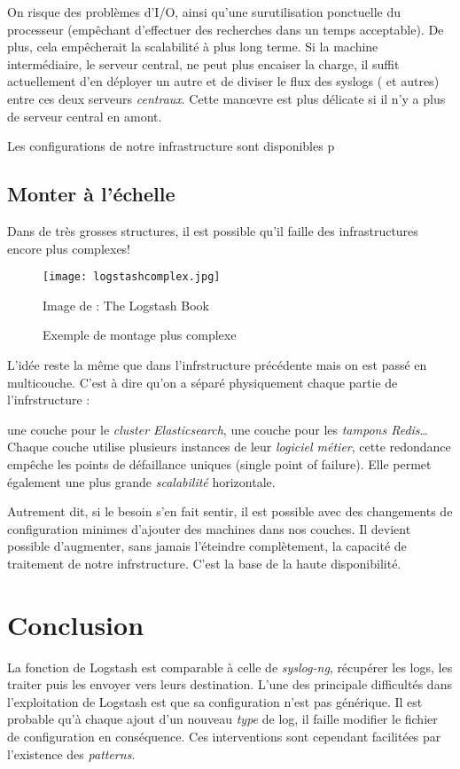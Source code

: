 On risque des problèmes d'I/O, ainsi qu'une surutilisation ponctuelle du processeur
(empêchant d'effectuer des recherches dans un temps acceptable).
De plus, cela empêcherait la scalabilité à plus long terme. 
Si la machine intermédiaire, le serveur central, ne peut plus encaiser la charge, 
il suffit actuellement d'en déployer un autre et de diviser le flux des syslogs (
et autres) entre ces deux serveurs \textit{centraux}. Cette manœvre est plus délicate 
si il n'y a plus de serveur central en amont.

Les configurations de notre infrastructure sont disponibles p\pageref{sec:codeprod}


\subsection{Monter à l'échelle}
Dans de très grosses structures, il est possible qu'il faille des infrastructures
encore plus complexes!

\begin{figure}[H]
\center
\texttt{[image: logstashcomplex.jpg]}
\label{fig:logstashcomplex}
\caption{Exemple de montage plus complexe}
{\footnotesize Image de : The Logstash Book}
\end{figure}

L'idée reste la même que dans l'infrstructure précédente mais on est passé en multicouche.
C'est à dire qu'on a séparé physiquement chaque partie de l'infrstructure : 

une couche pour le \textit{cluster Elasticsearch}, une couche pour les \textit{tampons Redis}\ldots
Chaque couche utilise plusieurs instances de leur \textit{logiciel métier}, cette redondance empêche les
points de défaillance uniques (single point of failure). Elle permet également une
plus grande \textit{scalabilité} horizontale. 

Autrement dit, si le besoin s'en fait
sentir, il est possible avec des changements de configuration minimes d'ajouter
des machines dans nos couches. Il devient possible d'augmenter, sans jamais l'éteindre
complètement, la capacité de traitement de notre infrstructure. C'est la base de la
haute disponibilité.


\section{Conclusion}
La fonction de Logstash est comparable à celle de \textit{syslog-ng}, récupérer les 
logs, les traiter puis les envoyer vers leurs destination. 
L'une des principale difficultés dans l'exploitation de Logstash est que sa configuration
n'est pas générique. Il est probable qu'à chaque ajout d'un nouveau \textit{type} 
de log, il faille modifier le fichier de configuration en conséquence. Ces interventions 
sont cependant facilitées par l'existence des \textit{patterns}.


